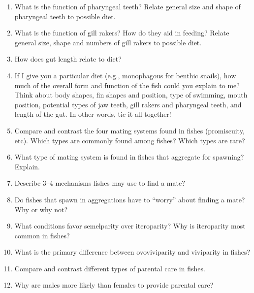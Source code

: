 \documentclass[letterpaper]{tufte-handout}
\begin{document}
\begin{enumerate}

	\item What is the function of pharyngeal teeth?  Relate general size and shape of pharyngeal teeth to possible diet.

	\item What is the function of gill rakers?  How do they aid in feeding?  Relate general size, shape and numbers of gill rakers to possible diet.

	\item How does gut length relate to diet?

	\item If I give you a particular diet (e.g., monophagous for benthic snails), how much of the overall form and function of the fish could you explain to me?  Think about body shapes, fin shapes and position, type of swimming, mouth position, potential types of jaw teeth, gill rakers and pharyngeal teeth, and length of the gut.  In other words, tie it all together!

	\item Compare and contrast the four mating systems found in fishes (promiscuity, etc). Which types are commonly found among fishes? Which types are rare?
	
	\item What type of mating system is found in fishes that aggregate for spawning? Explain.
	
	\item Describe 3–4 mechanisms fishes may use to find a mate?

	\item Do fishes that spawn in aggregations have to “worry” about finding a mate? Why or why not?
	

	\item What conditions favor semelparity over iteroparity?  Why is iteroparity most common in fishes?

	\item What is the primary difference between ovoviviparity and viviparity in fishes?

	\item Compare and contrast different types of parental care in fishes.
	
	\item Why are males more likely than females to provide parental care?


\end{enumerate}
\end{document}
